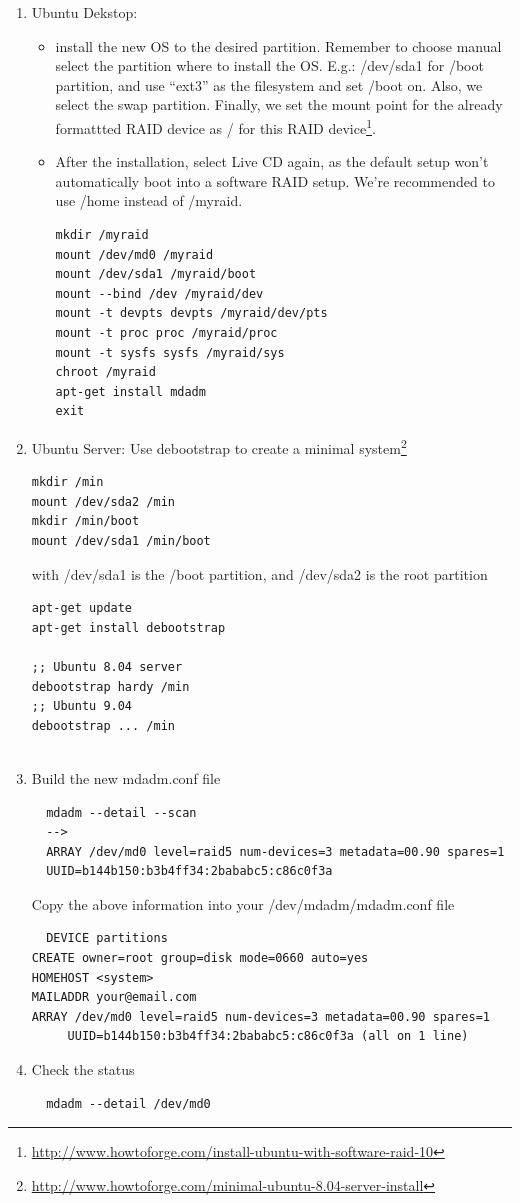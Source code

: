 \begin{enumerate}
  \item Ubuntu Dekstop: 
  
  \begin{itemize}
    \item install the new OS to the desired partition.
  Remember to choose manual select the partition where to install the OS. E.g.: /dev/sda1 for /boot
  partition, and use ``ext3'' as the filesystem and set /boot on. Also, we
  select the swap partition. Finally, we set the mount point for the already
  formattted RAID device as / for this RAID
  device\footnote{\url{http://www.howtoforge.com/install-ubuntu-with-software-raid-10}}.
  
    \item After the installation, select Live CD again, as the default setup
  won't automatically boot into a software RAID setup. We're recommended to use /home
  instead of /myraid.
  \begin{verbatim}
mkdir /myraid
mount /dev/md0 /myraid
mount /dev/sda1 /myraid/boot
mount --bind /dev /myraid/dev
mount -t devpts devpts /myraid/dev/pts
mount -t proc proc /myraid/proc
mount -t sysfs sysfs /myraid/sys
chroot /myraid
apt-get install mdadm
exit 
  \end{verbatim}
    \end{itemize}
    
   \item Ubuntu Server: Use debootstrap to create a minimal
   system\footnote{\url{http://www.howtoforge.com/minimal-ubuntu-8.04-server-install}}
   \begin{verbatim}
mkdir /min
mount /dev/sda2 /min
mkdir /min/boot
mount /dev/sda1 /min/boot
   \end{verbatim}
with /dev/sda1 is the /boot partition, and /dev/sda2 is the root partition   
\begin{verbatim}
apt-get update
apt-get install debootstrap

;; Ubuntu 8.04 server
debootstrap hardy /min
;; Ubuntu 9.04
debootstrap ... /min
 
\end{verbatim}   


  \item Build the new mdadm.conf file
  \begin{verbatim}
  mdadm --detail --scan
  -->
  ARRAY /dev/md0 level=raid5 num-devices=3 metadata=00.90 spares=1
  UUID=b144b150:b3b4ff34:2bababc5:c86c0f3a
  \end{verbatim}
  Copy the above information into your /dev/mdadm/mdadm.conf file
  \begin{verbatim}
  DEVICE partitions
CREATE owner=root group=disk mode=0660 auto=yes
HOMEHOST <system>
MAILADDR your@email.com
ARRAY /dev/md0 level=raid5 num-devices=3 metadata=00.90 spares=1 
     UUID=b144b150:b3b4ff34:2bababc5:c86c0f3a (all on 1 line)
  \end{verbatim}
  
  \item Check the status
  \begin{verbatim}
  mdadm --detail /dev/md0
  \end{verbatim}
  
  
\end{enumerate}

